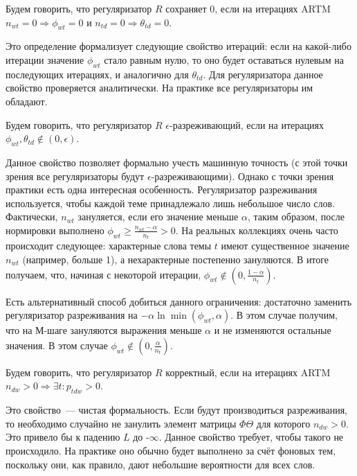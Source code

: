 \documentclass[12pt, twoside]{article}
\begin{document}
\begin{Definition}
Будем говорить, что регуляризатор $R$ сохраняет 0, если на итерациях ARTM $n_{wt} = 0 \Rightarrow \phi_{wt} = 0$ и $n_{td} = 0 \Rightarrow \theta_{td} = 0$.
\end{Definition}

Это определение формализует следующие свойство итераций: если на какой-либо итерации значение $\phi_{wt}$ стало равным нулю, то оно будет оставаться нулевым на последующих итерациях, и аналогично для $\theta_{td}$. Для регуляризатора данное свойство проверяется аналитически. На практике все регуляризаторы им обладают.

\begin{Definition}
\label{sparsereg}
Будем говорить, что регуляризатор $ R$ $\epsilon$-разреживающий, если на итерациях $\phi_{wt}, \theta_{td} \notin (0, \epsilon)$.
\end{Definition}

Данное свойство позволяет формально учесть машинную точность (с этой точки зрения все регуляризаторы будут $\epsilon$-разреживающими). Однако с точки зрения практики есть одна интересная особенность. Регуляризатор разреживания используется, чтобы каждой теме принадлежало лишь небольшое число слов. Фактически,  $n_{wt}$ зануляется, если его значение меньше $\alpha$, таким образом, после нормировки выполнено $\phi_{wt} \geq \frac{n_{wt} - \alpha}{n_t} > 0$.  На реальных коллекциях очень часто происходит следующее: характерные слова темы $t$ имеют существенное значение $n_{wt}$ (например, больше 1), а нехарактерные постепенно зануляются. В итоге получаем, что, начиная с некоторой итерации, $\phi_{wt} \notin (0, \frac{1-\alpha}{n_t})$.

Есть альтернативный способ добиться данного ограничения: достаточно заменить регуляризатор разреживания на $-\alpha \ln \min(\phi_{wt}, \alpha)$. В этом случае получим, что на М-шаге зануляются выражения меньше $\alpha$ и не изменяются остальные значения. В этом случае $\phi_{wt}\notin (0, \frac{\alpha}{n_t})$.

\begin{Definition}
\label{fairreg}
Будем говорить, что регуляризатор $R$ корректный, если на итерациях ARTM $n_{dw} > 0 \Rightarrow \exists t\colon p_{tdw} > 0$.
\end{Definition}

Это свойство~--- чистая формальность. Если будут производиться разреживания, то необходимо случайно не занулить элемент матрицы $\Phi \Theta$ для которого $n_{dw} > 0$. Это привело бы к падению $L$ до -$\infty$.  Данное свойство требует, чтобы такого не происходило. На практике оно обычно будет выполнено за счёт фоновых тем\cite{vorontsov2014tutorial}, поскольку они, как правило, дают небольшие вероятности для всех слов.
\end{document}
